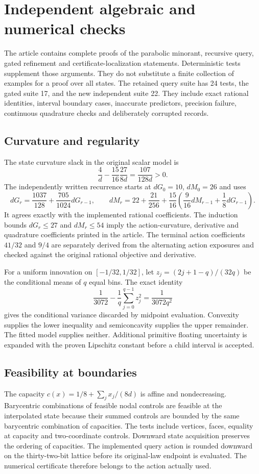 \section{Independent algebraic and numerical checks}\label{supp:checks65}
The article contains complete proofs of the parabolic minorant, recursive query, gated refinement and certificate-localization statements. Deterministic tests supplement those arguments. They do not substitute a finite collection of examples for a proof over all states. The retained query suite has 24 tests, the gated suite 17, and the new independent suite 22. They include exact rational identities, interval boundary cases, inaccurate predictors, precision failure, continuous quadrature checks and deliberately corrupted records.

\subsection{Curvature and regularity}
The state curvature slack in the original scalar model is
\[
 \frac4d-\frac{15}{16}\frac{27}{8d}=\frac{107}{128d}>0.
\]
The independently written recurrence starts at $dG_0=10$, $dM_0=26$ and uses
\[
 dG_r=\frac{1037}{128}+\frac{705}{1024}dG_{r-1},\qquad
 dM_r=22+\frac{21}{256}+\frac{15}{16}
        \left(\frac9{16}dM_{r-1}+\frac18dG_{r-1}\right).
\]
It agrees exactly with the implemented rational coefficients. The induction bounds $dG_r\le27$ and $dM_r\le54$ imply the action-curvature, derivative and quadrature coefficients printed in the article. The terminal action coefficients $41/32$ and $9/4$ are separately derived from the alternating action exposures and checked against the original rational objective and derivative.

For a uniform innovation on $[-1/32,1/32]$, let $z_j=(2j+1-q)/(32q)$ be the conditional means of $q$ equal bins. The exact identity
\[
 \frac1{3072}-\frac1q\sum_{j=0}^{q-1}z_j^2
 =\frac1{3072q^2}
\]
gives the conditional variance discarded by midpoint evaluation. Convexity supplies the lower inequality and semiconcavity supplies the upper remainder. The fitted model supplies neither. Additional primitive floating uncertainty is expanded with the proven Lipschitz constant before a child interval is accepted.

\subsection{Feasibility at boundaries}
The capacity $c(x)=1/8+\sum_j x_j/(8d)$ is affine and nondecreasing. Barycentric combinations of feasible nodal controls are feasible at the interpolated state because their summed controls are bounded by the same barycentric combination of capacities. The tests include vertices, faces, equality at capacity and two-coordinate controls. Downward state acquisition preserves the ordering of capacities. The implemented query action is rounded downward on the thirty-two-bit lattice before its original-law endpoint is evaluated. The numerical certificate therefore belongs to the action actually used.

